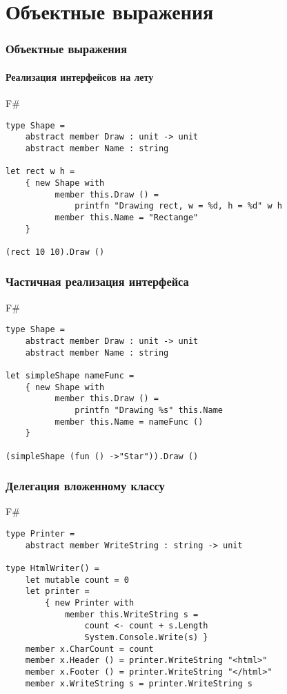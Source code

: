 \documentclass[xetex,mathserif,serif]{beamer}
\begin{document}
	\section{Объектные выражения}

	\begin{frame}[fragile]
		\frametitle{Объектные выражения}
		\framesubtitle{Реализация интерфейсов на лету}
		\begin{exampleblock}{F\#}
			\begin{verbatim}
type Shape =
    abstract member Draw : unit -> unit
    abstract member Name : string

let rect w h = 
    { new Shape with
          member this.Draw () = 
              printfn "Drawing rect, w = %d, h = %d" w h
          member this.Name = "Rectange"
    }

(rect 10 10).Draw ()
			\end{verbatim}
		\end{exampleblock}
\end{frame}

	\begin{frame}[fragile]
		\frametitle{Частичная реализация интерфейса}
		\begin{exampleblock}{F\#}
			\begin{verbatim}
type Shape =
    abstract member Draw : unit -> unit
    abstract member Name : string

let simpleShape nameFunc = 
    { new Shape with
          member this.Draw () = 
              printfn "Drawing %s" this.Name
          member this.Name = nameFunc ()
    }

(simpleShape (fun () ->"Star")).Draw ()
			\end{verbatim}
		\end{exampleblock}
\end{frame}

	\begin{frame}[fragile]
		\frametitle{Делегация вложенному классу}
		\begin{exampleblock}{F\#}
			\begin{verbatim}
type Printer =
    abstract member WriteString : string -> unit

type HtmlWriter() =
    let mutable count = 0
    let printer =
        { new Printer with
            member this.WriteString s =
                count <- count + s.Length
                System.Console.Write(s) }
    member x.CharCount = count
    member x.Header () = printer.WriteString "<html>"
    member x.Footer () = printer.WriteString "</html>"
    member x.WriteString s = printer.WriteString s
			\end{verbatim}
		\end{exampleblock}
\end{frame}
\end{document}
